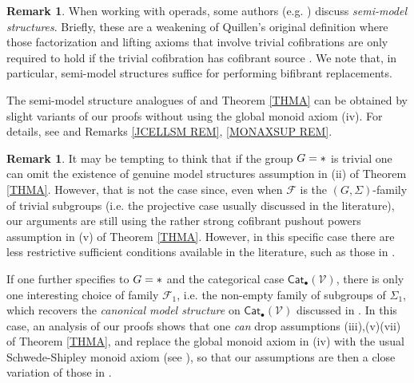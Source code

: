 \documentclass[a4paper,10pt
,draft
]{article}%
\numberwithin{equation}{section}
\numberwithin{figure}{section}
\theoremstyle{definition} %
\newtheorem{remark}[equation]{Remark}%
\newcommand{\Cat}{\mathsf{Cat}}
\newcommand{\F}{\ensuremath{\mathcal F}}
\newcommand{\V}{\ensuremath{\mathcal V}}
\newcommand{\1}{\ensuremath{\mathbbm 1}}%
\begin{document}
\begin{remark}\label{SEMI_REM}
	When working with operads, some authors (e.g. \cite{Spi,Whi17,WY18,BP_geo})
	discuss \emph{semi-model structures}.
	Briefly, these are a weakening of Quillen's original definition
	where those factorization and lifting axioms
	that involve trivial cofibrations
	are only required to hold if the trivial cofibration 
	has cofibrant source \cite[\S 2.2]{WY18}.
	We note that, in particular, semi-model structures suffice for 
	performing %
	bifibrant replacements.
        
	The semi-model structure analogues of 
	\cite[Thms. \ref{OC-THMI} and \ref{OC-THMII}]{BP_FCOP}
	and Theorem \ref{THMA}
	can be obtained by slight variants of our proofs
	without using the global monoid axiom (iv).
	For details, see \cite[Rem. \ref{OC-THMISM REM}]{BP_FCOP}
	and Remarks \ref{JCELLSM REM}, \ref{MONAXSUP REM}.
\end{remark}



\begin{remark}\label{GTRIV REM}
	It may be tempting to think that if the group $G=\**$ is trivial
	one can omit the existence of genuine model structures assumption in (ii) of Theorem \ref{THMA}.
	However, that is not the case since, 
	even when $\F$ is the $(G,\Sigma)$-family of trivial subgroups
	(i.e. the projective case usually discussed in the literature),
	our arguments are still using the rather strong
	cofibrant pushout powers assumption in 
	(v) of Theorem \ref{THMA}.
	However, in this specific case 
	there are less restrictive sufficient conditions available in the literature, such as those in \cite[Thm. 1.1]{PS18}.

	If one further specifies to 
	$G=\**$ and the categorical case $\Cat_\bullet(\V)$,
	there is only one interesting choice of family $\F_1$,
	i.e. the non-empty family of subgroups of $\Sigma_1$,
	which recovers the \emph{canonical model structure} on 
	$\Cat_\bullet(\V)$ discussed in \cite{BM13}.
	In this case, an analysis of our proofs shows that
	one \emph{can}
	drop assumptions (iii),(v)(vii) of Theorem \ref{THMA},
	and replace the global monoid axiom in (iv) 
	with the usual Schwede-Shipley
	monoid axiom \cite{SS00}
	(see \cite[Rem. \ref{OC-MONAX_REM}]{BP_FCOP}),
	so that our assumptions are then a close variation of those in \cite{BM13}.
\end{remark}
\end{document}
